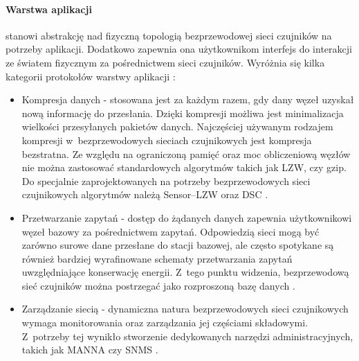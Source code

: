 \paragraph{Warstwa aplikacji}
stanowi abstrakcję nad fizyczną topologią bezprzewodowej sieci czujników na potrzeby aplikacji. Dodatkowo zapewnia ona użytkownikom interfejs do interakcji ze światem fizycznym za pośrednictwem sieci czujników. Wyróżnia się kilka kategorii protokołów warstwy aplikacji \cite{Akyildiz2010}:
\begin{itemize}
\item Kompresja danych - stosowana jest za każdym razem, gdy dany węzeł uzyskał nową informację do przesłania. Dzięki kompresji możliwa jest minimalizacja wielkości przesyłanych pakietów danych. Najczęściej używanym rodzajem kompresji w~bezprzewodowych sieciach czujnikowych jest kompresja bezstratna. Ze względu na ograniczoną pamięć oraz moc obliczeniową węzłów nie można zastosować standardowych algorytmów takich jak LZW, czy gzip. Do specjalnie zaprojektowanych na potrzeby bezprzewodowych sieci czujnikowych algorytmów należą Sensor–LZW \cite{Sadler2006} oraz DSC \cite{Slepian1973, Wyner1976}.
\item Przetwarzanie zapytań - dostęp do żądanych danych zapewnia użytkownikowi węzeł bazowy za pośrednictwem zapytań. Odpowiedzią sieci mogą być zarówno surowe dane przesłane do stacji bazowej, ale często spotykane są również bardziej wyrafinowane schematy przetwarzania zapytań uwzględniające konserwację energii. Z~tego punktu widzenia, bezprzewodową sieć czujników można postrzegać jako rozproszoną bazę danych \cite{Madden2002}.
\item Zarządzanie siecią - dynamiczna natura bezprzewodowych sieci czujnikowych wymaga monitorowania oraz zarządzania jej częściami składowymi. Z~potrzeby tej wynikło stworzenie dedykowanych narzędzi administracyjnych, takich jak MANNA \cite{Ruiz2003} czy SNMS \cite{Tolle2005}.
\end{itemize}

